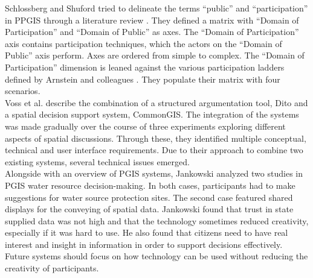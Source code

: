 Schlossberg and Shuford tried to delineate the terms ``public'' and ``participation'' in PPGIS through a literature review \cite{Schlossberg2005_PPGIS}. They defined a matrix with ``Domain of Participation'' and ``Domain of Public'' as axes. The ``Domain of Participation'' axis contains participation techniques, which the actors on the ``Domain of Public'' axis perform. Axes are ordered from simple to complex. The ``Domain of Participation'' dimension is leaned against the various participation ladders defined by Arnstein and colleagues \cite{Arnstein1969_citizen_participation,Wiedemann1993355,Connor1988_new_ladder}. They populate their matrix with four scenarios.\\
Voss et al. \cite{Voss2004_Evolution_PGIS} describe the combination of a structured argumentation tool, Dito and a spatial decision support system, CommonGIS. The integration of the systems was made gradually over the course of three experiments exploring different aspects of spatial discussions. Through these, they identified multiple conceptual, technical and user interface requirements. Due to their approach to combine two existing systems, several technical issues emerged.\\
Alongside with an overview of PGIS systems, Jankowski \cite{Jankowski2005_community_based_pgis} analyzed two studies in PGIS water resource decision-making. In both cases, participants had to make suggestions for water source protection sites. The second case featured shared displays for the conveying of spatial data. Jankowski found that trust in state supplied data was not high and that the technology sometimes reduced creativity, especially if it was hard to use. He also found that citizens need to have real interest and insight in information in order to support decisions effectively. Future systems should focus on how technology can be used without reducing the creativity of participants.

